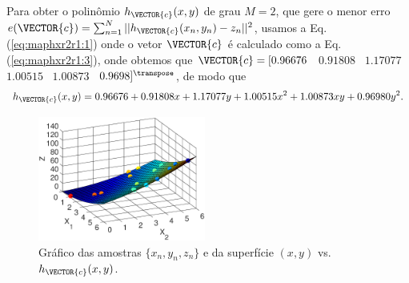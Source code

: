\begin{SolutionT}\label{sol:theo:maphxr2r1}
Para obter o polinômio $h_{\VECTOR{c}}(x,y)$ de grau $M=2$, 
que gere o menor erro $e(\VECTOR{c}) =  \sum_{n=1}^{N} ||h_{\VECTOR{c}}(x_n,y_n)-z_n||^2$,
usamos a Eq. (\ref{eq:maphxr2r1:1}) onde o vetor $\VECTOR{c}$ é calculado como a Eq. (\ref{eq:maphxr2r1:3}),
onde obtemos que $\VECTOR{c}=[0.96676$~ $0.91808$~ $1.17077$~ $1.00515$~ $1.00873$~ $0.9698]^{\transpose}$, de modo que
\begin{equation}
h_{\VECTOR{c}}(x,y) =   0.96676 +0.91808 x +1.17077 y +1.00515 x^2 +1.00873 xy +0.96980 y^2.
\end{equation}
    \begin{figure}[!h]
        \centering
        \includegraphics[width=0.49\textwidth]{chapters/mapeamento/mfiles/mapeamentor2r1/minimizando_hx.eps}
        \caption{Gráfico das amostras $\{x_n,y_n,z_n\}$ e da superfície $(x,y)$ vs. $h_{\VECTOR{c}}(x,y)$.}
        \label{fig:theo:maphxr2r1:xnyn}
    \end{figure}

\end{SolutionT}


